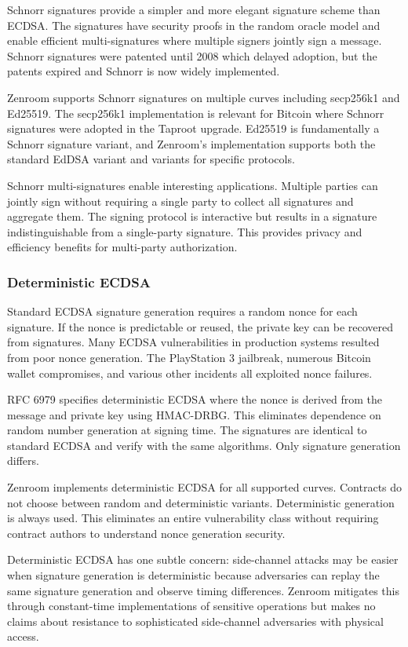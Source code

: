Schnorr signatures provide a simpler and more elegant signature scheme
than ECDSA. The signatures have security proofs in the random oracle
model and enable efficient multi-signatures where multiple signers
jointly sign a message. Schnorr signatures were patented until 2008
which delayed adoption, but the patents expired and Schnorr is now
widely implemented.

Zenroom supports Schnorr signatures on multiple curves including
secp256k1 and Ed25519. The secp256k1 implementation is relevant for
Bitcoin where Schnorr signatures were adopted in the Taproot
upgrade. Ed25519 is fundamentally a Schnorr signature variant, and
Zenroom's implementation supports both the standard EdDSA variant and
variants for specific protocols.

Schnorr multi-signatures enable interesting applications. Multiple
parties can jointly sign without requiring a single party to collect
all signatures and aggregate them. The signing protocol is interactive
but results in a signature indistinguishable from a single-party
signature. This provides privacy and efficiency benefits for
multi-party authorization.

\subsubsection{Deterministic ECDSA}

Standard ECDSA signature generation requires a random nonce for each
signature. If the nonce is predictable or reused, the private key can
be recovered from signatures. Many ECDSA vulnerabilities in production
systems resulted from poor nonce generation. The PlayStation 3
jailbreak, numerous Bitcoin wallet compromises, and various other
incidents all exploited nonce failures.

RFC 6979 specifies deterministic ECDSA where the nonce is derived from
the message and private key using HMAC-DRBG. This eliminates
dependence on random number generation at signing time. The signatures
are identical to standard ECDSA and verify with the same
algorithms. Only signature generation differs.

Zenroom implements deterministic ECDSA for all supported
curves. Contracts do not choose between random and deterministic
variants. Deterministic generation is always used. This eliminates an
entire vulnerability class without requiring contract authors to
understand nonce generation security.

Deterministic ECDSA has one subtle concern: side-channel attacks may
be easier when signature generation is deterministic because
adversaries can replay the same signature generation and observe
timing differences. Zenroom mitigates this through constant-time
implementations of sensitive operations but makes no claims about
resistance to sophisticated side-channel adversaries with physical
access.

